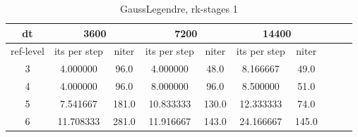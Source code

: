 \documentclass[a4paper, 12pt]{article}
\begin{document}
\begin{table}[h]
\begin{scriptsize}
\begin{tabular}{c|c|c|c|c|c|c|c|c|c}
\multicolumn{0}{c|}{dt} &
\multicolumn{2}{c|}{3600} &
\multicolumn{2}{c|}{7200} &
\multicolumn{2}{c|}{14400}
\\ \hline\hline
ref-level &   its per step &   niter & its per step &   niter & its per step &   niter  \\ \hline
     3    &   4.000000  & 96.0 & 4.000000 &  48.0&  8.166667 &  49.0\\
     4   &     4.000000 &  96.0 &8.000000 &  96.0 &8.500000  & 51.0\\
     5   &    7.541667 & 181.0 & 10.833333 & 130.0&12.333333 &  74.0 \\
     6   &   11.708333 & 281.0 & 11.916667 & 143.0&  24.166667 & 145.0
\end{tabular}
\caption{GaussLegendre, rk-stages 1}
\label{tab_niter_vs_spatial}
\end{scriptsize}
\end{table}
\end{document}

